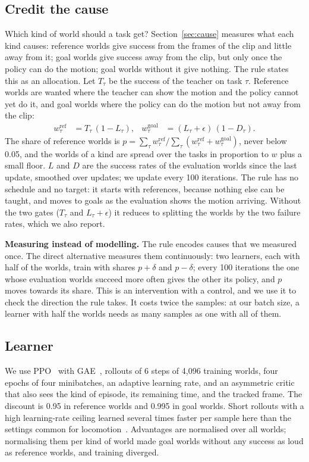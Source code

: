 \subsection{Credit the cause}
\label{sec:rule}

Which kind of world should a task get? Section~\ref{sec:cause} measures what each kind causes: reference worlds give success from the frames of the clip and little away from it; goal worlds give success away from the clip, but only once the policy can do the motion; goal worlds without it give nothing. The rule states this as an allocation. Let $T_\tau$ be the success of the teacher on task $\tau$. Reference worlds are wanted where the teacher can show the motion and the policy cannot yet do it, and goal worlds where the policy can do the motion but not away from the clip:
\begin{align}
w^{\text{ref}}_\tau &= T_\tau\,(1 - L_\tau), &
w^{\text{goal}}_\tau &= (L_\tau + \epsilon)\,(1 - D_\tau).
\end{align}
The share of reference worlds is $p = \sum_\tau w^{\text{ref}}_\tau / \sum_\tau (w^{\text{ref}}_\tau + w^{\text{goal}}_\tau)$, never below 0.05, and the worlds of a kind are spread over the tasks in proportion to $w$ plus a small floor. $L$ and $D$ are the success rates of the evaluation worlds since the last update, smoothed over updates; we update every 100 iterations. The rule has no schedule and no target: it starts with references, because nothing else can be taught, and moves to goals as the evaluation shows the motion arriving. Without the two gates ($T_\tau$ and $L_\tau+\epsilon$) it reduces to splitting the worlds by the two failure rates, which we also report.

\textbf{Measuring instead of modelling.} The rule encodes causes that we measured once. The direct alternative measures them continuously: two learners, each with half of the worlds, train with shares $p+\delta$ and $p-\delta$; every 100 iterations the one whose evaluation worlds succeed more often gives the other its policy, and $p$ moves towards its share. This is an intervention with a control, and we use it to check the direction the rule takes. It costs twice the samples: at our batch size, a learner with half the worlds needs as many samples as one with all of them.

\subsection{Learner}

We use PPO~\cite{ppo} with GAE~\cite{gae}, rollouts of 6 steps of 4{,}096 training worlds, four epochs of four minibatches, an adaptive learning rate, and an asymmetric critic~\cite{pinto2018asymmetric} that also sees the kind of episode, its remaining time, and the tracked frame. The discount is 0.95 in reference worlds and 0.995 in goal worlds. Short rollouts with a high learning-rate ceiling learned several times faster per sample here than the settings common for locomotion~\cite{rudin2022minutes}. Advantages are normalised over all worlds; normalising them per kind of world made goal worlds without any success as loud as reference worlds, and training diverged.
